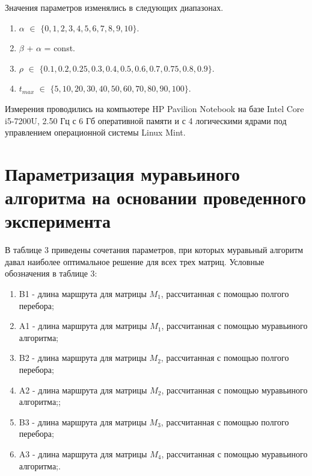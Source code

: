 \documentclass[a4paper,14pt]{report}
\begin{document}
Значения параметров изменялись в следующих диапазонах.

\begin{enumerate}
	\item $\alpha$ $\in$ $\{0, 1, 2, 3, 4, 5, 6, 7, 8, 9, 10\}$.
	\item $\beta$ + $\alpha$ = const.
	\item $\rho$ $\in$ $\{0.1, 0.2, 0.25, 0.3, 0.4, 0.5, 0.6, 0.7, 0.75, 0.8, 0.9\}$.
	\item $t_{max}$ $\in$ $\{5, 10, 20, 30, 40, 50, 60, 70, 80, 90, 100\}$.
\end{enumerate}

Измерения проводились на компьютере HP Pavilion Notebook на базе Intel Core i5-7200U, 2.50 Гц с 6 Гб оперативной памяти и с 4 логическими ядрами под управлением операционной системы Linux Mint.

\section*{Параметризация муравьиного алгоритма на основании проведенного эксперимента}

В таблице 3 приведены сочетания параметров, при которых муравьный алгоритм давал наиболее оптимальное решение для всех трех матриц.
Условные обозначения в таблице 3:
\begin{enumerate}
	\item B1 - длина маршрута для матрицы $M_{1}$, рассчитанная с помощью полгого перебора;
	\item A1 - длина маршрута для матрицы $M_{1}$, рассчитанная с помощью муравьиного алгоритма;
	\item B2 - длина маршрута для матрицы $M_{2}$, рассчитанная с помощью полгого перебора;
	\item A2 - длина маршрута для матрицы $M_{2}$, рассчитанная с помощью муравьиного алгоритма;;
	\item B3 - длина маршрута для матрицы $M_{3}$, рассчитанная с помощью полгого перебора;
	\item A3 - длина маршрута для матрицы $M_{4}$, рассчитанная с помощью муравьиного алгоритма;.
\end{enumerate}
\end{document}
